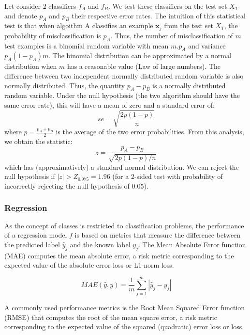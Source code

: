 Let consider 2 classifiers $f_A$ and $f_B$. We test these classifiers on the test set $X_T$ and denote $p_A$ and $p_B$ their respective error rates. The intuition of this statistical test is that when algoithm A classifies an example $\textbf{x}_j$ from the test set $X_T$, the probability of misclassification is $p_A$. Thus, the number of misclassification of $m$ test examples is a binomial random variable with mean $m.p_A$ and variance $p_A(1-p_A)m$. The binomial distribution can be approximated by a normal distribution when $m$ has a reasonable value (Law of large numbers). The difference between two independent normally distributed random variable is also normally distributed. Thus, the quantity $p_A-p_B$ is a normally distributed random variable. Under the null hypothesis (the two algorithm should have the same error rate), this will have a mean of zero and a standard error of:
\begin{equation}
se = \sqrt{\frac{2p(1-p)}{n}}
\end{equation}
\noindent where $p=\frac{p_A+p_B}{2}$ is the average of the two error probabilities. From this analysis, we obtain the statistic:
\begin{equation}
z=\frac{p_A-p_B}{\sqrt{2p(1-p)/n}}
\end{equation}
\noindent which has (approximatively) a standard normal distribution. We can reject the null hypothesis if $|z| > Z_{0.975} = 1.96$ (for a 2-sided test with probability of incorrectly rejecting the null hypothesis of 0.05).


\subsubsection{Regression}
As the concept of classes is restricted to classification problems, the performance of a regression model $f$ is based on metrics that measure the difference between the predicted label $\hat{y}_j$ and the known label $y_j$. The Mean Absolute Error function (MAE) computes the mean absolute error, a risk metric corresponding to the expected value of the absolute error loss or L1-norm loss.

\begin{equation}
MAE(\hat{y},y) = \frac{1}{m} \sum_{j=1}^m|\hat{y}_j-y_j|
\end{equation}

A commonly used performance metrics is the Root Mean Squared Error function (RMSE) that computes the root of the mean square error, a risk metric corresponding to the expected value of the squared (quadratic) error loss or loss.

